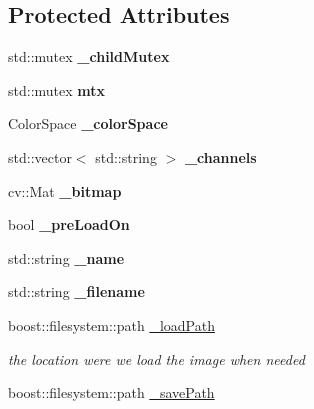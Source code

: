 \subsection*{Protected Attributes}
\begin{DoxyCompactItemize}
\item 
std\+::mutex {\bfseries \+\_\+child\+Mutex}\hypertarget{classImage_a64bb7abc523a4788f67325e9546f6930}{}\label{classImage_a64bb7abc523a4788f67325e9546f6930}

\item 
std\+::mutex {\bfseries mtx}\hypertarget{classImage_a395fed1c28872b35071d1c20bd7e8d4a}{}\label{classImage_a395fed1c28872b35071d1c20bd7e8d4a}

\item 
Color\+Space {\bfseries \+\_\+color\+Space}\hypertarget{classImage_a7e53861a6bf28cc17f50b455b2e12870}{}\label{classImage_a7e53861a6bf28cc17f50b455b2e12870}

\item 
std\+::vector$<$ std\+::string $>$ {\bfseries \+\_\+channels}\hypertarget{classImage_ae124805d09fdb8a4c5949d26be8b5665}{}\label{classImage_ae124805d09fdb8a4c5949d26be8b5665}

\item 
cv\+::\+Mat {\bfseries \+\_\+bitmap}\hypertarget{classImage_aa6dccdccfa626658a905158033b94350}{}\label{classImage_aa6dccdccfa626658a905158033b94350}

\item 
bool {\bfseries \+\_\+pre\+Load\+On}\hypertarget{classImage_a34e92624409041b70f4f7e8178772daa}{}\label{classImage_a34e92624409041b70f4f7e8178772daa}

\item 
std\+::string {\bfseries \+\_\+name}\hypertarget{classImage_a710cbb535c1f1d4cfa084ee4e3bc5a94}{}\label{classImage_a710cbb535c1f1d4cfa084ee4e3bc5a94}

\item 
std\+::string {\bfseries \+\_\+filename}\hypertarget{classImage_a8a135e263fc865714385e3d8d79214b3}{}\label{classImage_a8a135e263fc865714385e3d8d79214b3}

\item 
boost\+::filesystem\+::path \hyperlink{classImage_a2c14564a147339a626465d6ced4f327c}{\+\_\+load\+Path}\hypertarget{classImage_a2c14564a147339a626465d6ced4f327c}{}\label{classImage_a2c14564a147339a626465d6ced4f327c}

\begin{DoxyCompactList}\small\item\em the location were we load the image when needed \end{DoxyCompactList}\item 
boost\+::filesystem\+::path \hyperlink{classImage_a4c9f29fea2927d0019d3c82c2faa9f9d}{\+\_\+save\+Path}\hypertarget{classImage_a4c9f29fea2927d0019d3c82c2faa9f9d}{}\label{classImage_a4c9f29fea2927d0019d3c82c2faa9f9d}


\end{DoxyCompactItemize}
